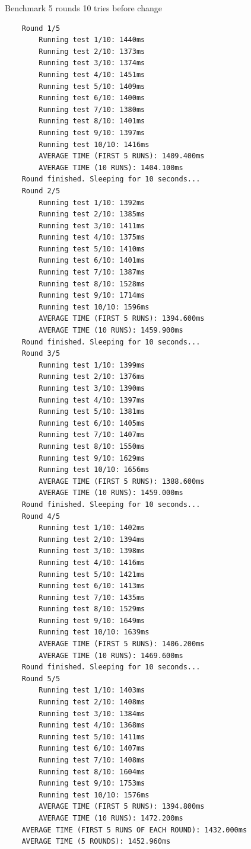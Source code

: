 Benchmark 5 rounds 10 tries before change
\footnotesize\begin{verbatim}
    Round 1/5
        Running test 1/10: 1440ms
        Running test 2/10: 1373ms
        Running test 3/10: 1374ms
        Running test 4/10: 1451ms
        Running test 5/10: 1409ms
        Running test 6/10: 1400ms
        Running test 7/10: 1380ms
        Running test 8/10: 1401ms
        Running test 9/10: 1397ms
        Running test 10/10: 1416ms
        AVERAGE TIME (FIRST 5 RUNS): 1409.400ms
        AVERAGE TIME (10 RUNS): 1404.100ms
    Round finished. Sleeping for 10 seconds...
    Round 2/5
        Running test 1/10: 1392ms
        Running test 2/10: 1385ms
        Running test 3/10: 1411ms
        Running test 4/10: 1375ms
        Running test 5/10: 1410ms
        Running test 6/10: 1401ms
        Running test 7/10: 1387ms
        Running test 8/10: 1528ms
        Running test 9/10: 1714ms
        Running test 10/10: 1596ms
        AVERAGE TIME (FIRST 5 RUNS): 1394.600ms
        AVERAGE TIME (10 RUNS): 1459.900ms
    Round finished. Sleeping for 10 seconds...
    Round 3/5
        Running test 1/10: 1399ms
        Running test 2/10: 1376ms
        Running test 3/10: 1390ms
        Running test 4/10: 1397ms
        Running test 5/10: 1381ms
        Running test 6/10: 1405ms
        Running test 7/10: 1407ms
        Running test 8/10: 1550ms
        Running test 9/10: 1629ms
        Running test 10/10: 1656ms
        AVERAGE TIME (FIRST 5 RUNS): 1388.600ms
        AVERAGE TIME (10 RUNS): 1459.000ms
    Round finished. Sleeping for 10 seconds...
    Round 4/5
        Running test 1/10: 1402ms
        Running test 2/10: 1394ms
        Running test 3/10: 1398ms
        Running test 4/10: 1416ms
        Running test 5/10: 1421ms
        Running test 6/10: 1413ms
        Running test 7/10: 1435ms
        Running test 8/10: 1529ms
        Running test 9/10: 1649ms
        Running test 10/10: 1639ms
        AVERAGE TIME (FIRST 5 RUNS): 1406.200ms
        AVERAGE TIME (10 RUNS): 1469.600ms
    Round finished. Sleeping for 10 seconds...
    Round 5/5
        Running test 1/10: 1403ms
        Running test 2/10: 1408ms
        Running test 3/10: 1384ms
        Running test 4/10: 1368ms
        Running test 5/10: 1411ms
        Running test 6/10: 1407ms
        Running test 7/10: 1408ms
        Running test 8/10: 1604ms
        Running test 9/10: 1753ms
        Running test 10/10: 1576ms
        AVERAGE TIME (FIRST 5 RUNS): 1394.800ms
        AVERAGE TIME (10 RUNS): 1472.200ms
    AVERAGE TIME (FIRST 5 RUNS OF EACH ROUND): 1432.000ms
    AVERAGE TIME (5 ROUNDS): 1452.960ms
\end{verbatim}
\normalsize

